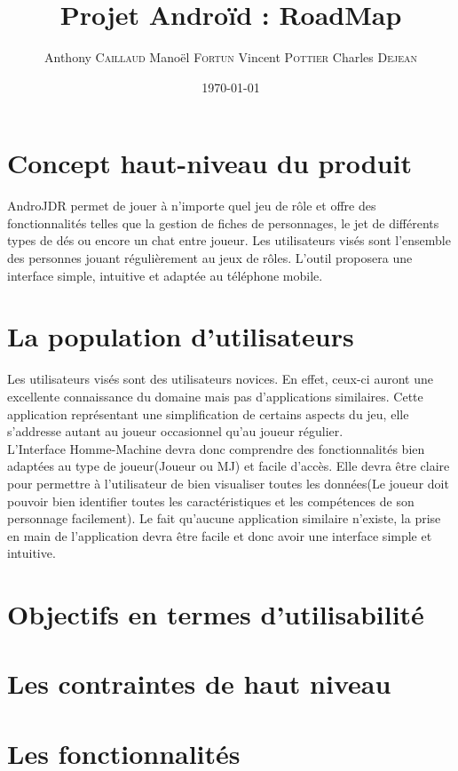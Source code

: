 \documentclass[11pt,a4paper]{article}
\title{Projet Androïd : RoadMap}
\author{Anthony \textsc{Caillaud} Manoël \textsc{Fortun} Vincent
\textsc{Pottier} Charles \textsc{Dejean}}
\date{\today}
\begin{document}
\maketitle

\clearpage
\tableofcontents
\clearpage
\section{Concept haut-niveau du produit}

AndroJDR permet de jouer à n'importe quel jeu de rôle et offre des
fonctionnalités telles que la gestion de fiches de personnages, le jet de
différents types de dés ou encore un chat entre joueur. Les utilisateurs visés
sont l'ensemble des personnes jouant régulièrement au jeux de rôles. L'outil
proposera une interface simple, intuitive et adaptée au téléphone mobile.

\section{La population d'utilisateurs}

Les utilisateurs visés sont des utilisateurs novices. En effet, ceux-ci auront
une excellente connaissance du domaine mais pas d'applications similaires.
Cette application représentant une simplification de certains aspects du jeu,
elle s'addresse autant au joueur occasionnel qu'au joueur régulier.\\

L'Interface Homme-Machine devra donc comprendre des fonctionnalités bien
adaptées au type de joueur(Joueur ou MJ) et facile d'accès. Elle devra être
claire pour permettre à l'utilisateur de bien visualiser toutes les données(Le
joueur doit pouvoir bien identifier toutes les caractéristiques et les compétences de
son personnage facilement). Le fait qu'aucune application similaire n'existe,
la prise en main de l'application devra être facile et donc avoir une interface
simple et intuitive.
	

\section{Objectifs en termes d'utilisabilité}



\section{Les contraintes de haut niveau}



\section{Les fonctionnalités}

\clearpage
  
\end{document}
